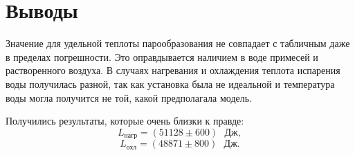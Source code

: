 \section{Выводы}

Значение для удельной теплоты парообразования не совпадает с табличным даже в пределах погрешности. Это оправдывается наличием в воде примесей и растворенного воздуха. В случаях нагревания и охлаждения теплота испарения воды получилась разной, так как установка была не идеальной и температура воды могла получится не той, какой предполагала модель.

Получились результаты, которые очень близки к правде:
\[L_\text{нагр} = (51128 \pm 600) \text{ }\text{Дж},\]
\[L_\text{охл} = (48871 \pm 800) \text{ }\text{Дж}.\]
